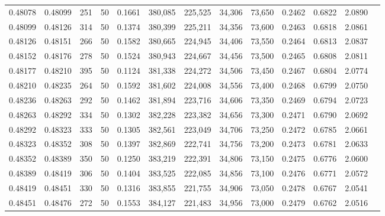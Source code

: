 \begin{tabular}{rrrrrrrrrrrrr}
0.48078 & 0.48099 &   251 &  50 &                                     0.1661 & 380,085 & 225,525 &  34,306 &  73,650 & 0.2462 & 0.6822 & 2.0890 \\
0.48099 & 0.48126 &   314 &  50 &                                     0.1374 & 380,399 & 225,211 &  34,356 &  73,600 & 0.2463 & 0.6818 & 2.0861 \\
0.48126 & 0.48151 &   266 &  50 &                                     0.1582 & 380,665 & 224,945 &  34,406 &  73,550 & 0.2464 & 0.6813 & 2.0837 \\
0.48152 & 0.48176 &   278 &  50 &                                     0.1524 & 380,943 & 224,667 &  34,456 &  73,500 & 0.2465 & 0.6808 & 2.0811 \\
0.48177 & 0.48210 &   395 &  50 &                                     0.1124 & 381,338 & 224,272 &  34,506 &  73,450 & 0.2467 & 0.6804 & 2.0774 \\
0.48210 & 0.48235 &   264 &  50 &                                     0.1592 & 381,602 & 224,008 &  34,556 &  73,400 & 0.2468 & 0.6799 & 2.0750 \\
0.48236 & 0.48263 &   292 &  50 &                                     0.1462 & 381,894 & 223,716 &  34,606 &  73,350 & 0.2469 & 0.6794 & 2.0723 \\
0.48263 & 0.48292 &   334 &  50 &                                     0.1302 & 382,228 & 223,382 &  34,656 &  73,300 & 0.2471 & 0.6790 & 2.0692 \\
0.48292 & 0.48323 &   333 &  50 &                                     0.1305 & 382,561 & 223,049 &  34,706 &  73,250 & 0.2472 & 0.6785 & 2.0661 \\
0.48323 & 0.48352 &   308 &  50 &                                     0.1397 & 382,869 & 222,741 &  34,756 &  73,200 & 0.2473 & 0.6781 & 2.0633 \\
0.48352 & 0.48389 &   350 &  50 &                                     0.1250 & 383,219 & 222,391 &  34,806 &  73,150 & 0.2475 & 0.6776 & 2.0600 \\
0.48389 & 0.48419 &   306 &  50 &                                     0.1404 & 383,525 & 222,085 &  34,856 &  73,100 & 0.2476 & 0.6771 & 2.0572 \\
0.48419 & 0.48451 &   330 &  50 &                                     0.1316 & 383,855 & 221,755 &  34,906 &  73,050 & 0.2478 & 0.6767 & 2.0541 \\
0.48451 & 0.48476 &   272 &  50 &                                     0.1553 & 384,127 & 221,483 &  34,956 &  73,000 & 0.2479 & 0.6762 & 2.0516 \\

\end{tabular}

